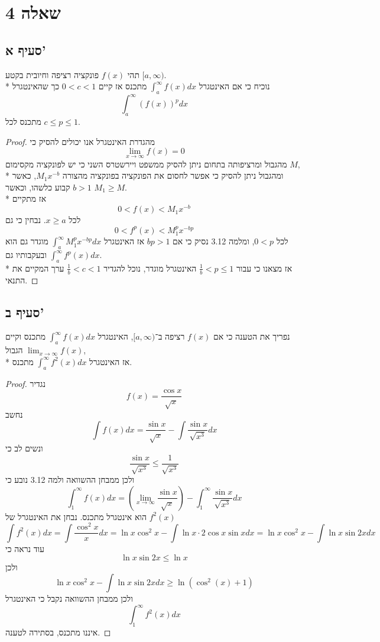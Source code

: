 \section{שאלה 4}
\subsection{סעיף א'}
תהי $f(x)$ פונקציה רציפה וחיובית בקטע $[a, \infty)$. \\* %
נוכיח כי אם האינטגרל $\int_a^\infty f(x) dx$ מתכנס אז קיים $0 < c < 1$ כך שהאינטגרל
\[
	\int_a^\infty {(f(x))}^p dx
\]
מתכנס לכל $c \le p \le 1$.
\begin{proof}
	מהגדרת האינטגרל אנו יכולים להסיק כי
	\[
		\lim_{x \to \infty} f(x) = 0
	\]
	מהגבול ומרציפותה בתחום ניתן להסיק ממשפט ויירשטרס השני כי יש לפונקציה מקסימום $M$, \\*
	ומהגבול ניתן להסיק כי אפשר לחסום את הפונקציה בפונקציה מהצורה $M_1 x^{-b}$, כאשר $b > 1$ קבוע כלשהו, וכאשר $M_1 \ge M$. \\*
	אז מתקיים
	\[
		0 < f(x) < M_1 x^{-b}
	\]
	לכל $x \ge a$. נבחין כי גם
	\[
		0 < f^p(x) < M_1^p x^{-bp}
	\]
	לכל $0 < p$, ומלמה 3.12 נסיק כי אם $bp > 1$ אז האינטגרל $\int_a^\infty M_1^p x^{-bp}dx$ מוגדר גם הוא ובעקבותיו גם $\int_a^\infty f^p(x) dx$. \\*
	אז מצאנו כי עבור $\frac{1}{b} < p \le 1$ האינטגרל מוגדר, נוכל להגדיר $\frac{1}{b} < c < 1$ ערך המקיים את התנאי.
\end{proof}

\subsection{סעיף ב'}
נפריך את הטענה כי
אם $f(x)$ רציפה ב־$[a, \infty)$, האינטגרל $\displaystyle\int_a^\infty f(x) dx$ מתכנס וקיים הגבול $\displaystyle\lim_{x \to \infty} f(x)$, \\* %
אז האינטגרל $\displaystyle\int_a^\infty f^2(x) dx$ מתכנס.
\begin{proof}
	נגדיר
	\[
		f(x) = \frac{\cos x}{\sqrt{x}}
	\]
	נחשב
	\[
		\int f(x) dx = \frac{\sin x}{\sqrt{x}} - \int \frac{\sin x}{\sqrt{x^3}} dx
	\]
	ונשים לב כי
	\[
		\frac{\sin x}{\sqrt{x^3}} \le \frac{1}{\sqrt{x^3}}
	\]
	ולכן ממבחן ההשוואה ולמה 3.12 נובע כי
	\[
		\int_1^\infty f(x) dx = \left( \lim_{x \to \infty} \frac{\sin x}{\sqrt{x}} \right) - \int_1^\infty \frac{\sin x}{\sqrt{x^3}} dx
	\]
	הוא אינטגרל מתכנס. נבחן את האינטגרל של $f^2(x)$
	\[
		\int f^2(x) dx
		= \int \frac{\cos^2 x}{x} dx
		= \ln x \cos^2 x - \int \ln x \cdot 2 \cos x \sin x dx
		= \ln x \cos^2 x - \int \ln x \sin 2x dx
	\]
	עוד נראה כי
	\[
		\ln x \sin 2x \le \ln x
	\]
	ולכן
	\[
		\ln x \cos^2 x - \int \ln x \sin 2x dx \ge \ln (\cos^2(x) + 1)
	\]
	ולכן ממבחן ההשוואה נקבל כי האינטגרל
	\[
		\int_1^\infty f^2(x) dx
	\]
	איננו מתכנס, בסתירה לטענה.
\end{proof}

